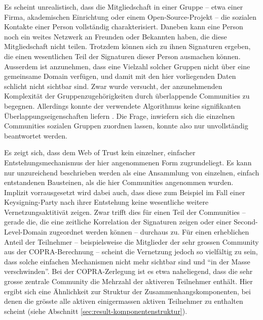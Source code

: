 Es scheint unrealistisch, dass die Mitgliedschaft in einer Gruppe --
etwa einer Firma, akademischen Einrichtung oder einem
Open-Source-Projekt -- die sozialen Kontakte einer Person
vollst\"andig charakterisiert. Daneben kann eine Person noch ein
weites Netzwerk an Freunden oder Bekannten haben, die diese
Mitgliedschaft nicht teilen. Trotzdem k\"onnen sich zu ihnen
Signaturen ergeben, die einen wesentlichen Teil der Signaturen dieser
Person ausmachen k\"onnen. Ausserdem ist anzunehmen, dass eine
Vielzahl solcher Gruppen nicht \"uber eine gemeinsame Domain
verf\"ugen, und damit mit den hier vorliegenden Daten schlicht nicht
sichtbar sind. Zwar wurde versucht, der anzunehmenden Komplexit\"at
der Gruppenzugeh\"origkeiten durch \"uberlappende Communities zu
begegnen. Allerdings konnte der verwendete Algorithmus keine
signifikanten \"Uberlappungseigenschaften liefern . Die Frage,
inwiefern sich die einzelnen Communities sozialen Gruppen zuordnen
lassen, konnte also nur unvollst\"andig beantwortet werden.

Es zeigt sich, dass dem Web of Trust kein einzelner, einfacher
Entstehungsmechanismus der hier angenommenen Form zugrundeliegt. Es
kann nur unzureichend beschrieben werden als eine Ansammlung von
einzelnen, einfach entstandenen Bausteinen, als die hier Communities
angenommen wurden. Implizit vorrausgesetzt wird dabei auch, dass diese
zum Beispiel im Fall einer Keysigning-Party nach ihrer Entstehung
keine wesentliche weitere Vernetzungsaktitiv\"at zeigen. Zwar trifft
dies f\"ur einen Teil der Communities -- gerade die, die eine
zeitliche Korrelation der Signaturen zeigen oder einer
Second-Level-Domain zugeordnet werden k\"onnen -- durchaus zu. F\"ur
einen erheblichen Anteil der Teilnehmer -- beispielsweise die
Mitglieder der sehr grossen Community aus der COPRA-Berechnung --
scheint die Vernetzung jedoch so vielf\"altig zu sein, dass solche
einfachen Mechanismen nicht mehr sichtbar sind und ``in der Masse
verschwinden''. Bei der COPRA-Zerlegung ist es etwa naheliegend, dass
die sehr grosse zentrale Community die Mehrzahl der aktiveren
Teilnehmer enth\"alt. Hier ergibt sich eine \"Ahnlichkeit zur Struktur
der Zusammenhangskomponenten, bei denen die gr\"osste alle aktiven
einigermassen aktiven Teilnehmer zu enthalten scheint (siehe Abschnitt
\ref{sec:result-komponentenstruktur}).

